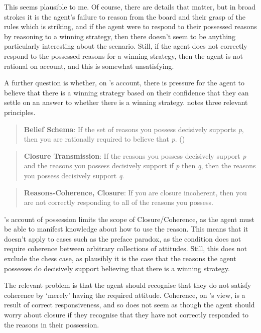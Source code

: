 \documentclass[10pt]{article}
\begin{document}
This seems plausible to me.
Of course, there are details that matter, but in broad strokes it is the agent's failure to reason from the board and their grasp of the rules which is striking, and if the agent were to respond to their possessed reasons by reasoning to a winning strategy, then there doesn't seem to be anything particularly interesting about the scenario.
Still, if the agent does not correctly respond to the possessed reasons for a winning strategy, then the agent is not rational on \citeauthor{Lord:2018aa} account, and this is somewhat unsatisfying.



A further question is whether, on \citeauthor{Lord:2018aa}'s account, there is pressure for the agent to believe that there is a winning strategy based on their confidence that they can settle on an answer to whether there is a winning strategy.
\citeauthor{Lord:2018aa} notes three relevant principles.

\begin{quote}
  \textbf{Belief Schema}: If the set of reasons you possess decisively supports \emph{p}, then you are rationally required to believe that \emph{p}.\nolinebreak
  \mbox{}\hfill\mbox{(\citeyear[28]{Lord:2018aa})}
\end{quote}

\begin{quote}
  \textbf{Closure Transmission}: If the reasons you possess decisively support \emph{p} and the reasons you possess decisively support if \emph{p} then \emph{q}, then the reasons you possess decisively support \emph{q}.
\end{quote}

\begin{quote}
  \textbf{Reasons-Coherence, Closure}: If you are closure incoherent, then you are not correctly responding to all of the reasons you possess.
\end{quote}

\citeauthor{Lord:2018aa}'s account of possession limits the scope of Closure/Coherence, as the agent must be able to manifest knowledge about how to use the reason.
This means that it doesn't apply to cases such as the preface paradox, as the condition does not require coherence between arbitrary collections of attitudes.
Still, this does not exclude the chess case, as plausibly it is the case that the reasons the agent possesses do decisively support believing that there is a winning strategy.

The relevant problem is that the agent should recognise that they do not satisfy coherence by `merely' having the required attitude.
Coherence, on \citeauthor{Lord:2018aa}'s view, is a result of correct responsiveness, and so does not seem as though the agent should worry about closure if they recognise that they have not correctly responded to the reasons in their possession.
\end{document}
